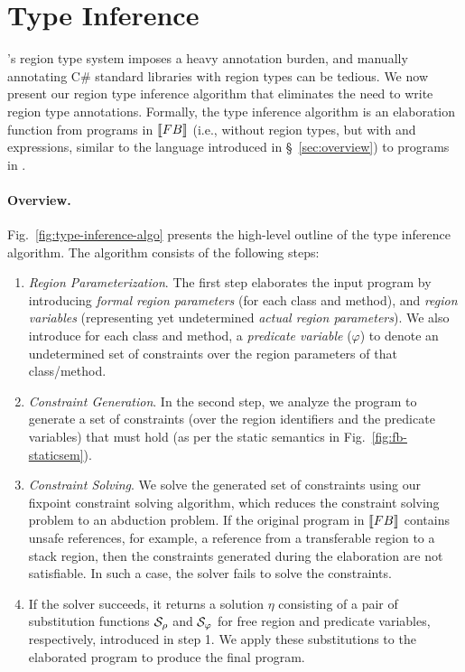 \newcommand{\soln}{\eta}
\newcommand{\saturate}[1]{{#1}^*}
\newcommand{\groundc}[1]{\saturate{#1}_g}

\section{Type Inference}
\label{sec:type-inference}

\name's region type system imposes a heavy annotation burden, and
manually annotating C\# standard libraries with region types
can be tedious. We now present our region type inference algorithm
that eliminates the need to write region type annotations.
Formally, the type inference
algorithm is an elaboration function from programs in $\llbracket {\sc FB} \rrbracket$
(i.e., \FB without region types, but with  and 
expressions, similar to the language introduced in
\S~\ref{sec:overview}) to programs in \FB.

\paragraph{Overview.}

Fig.~\ref{fig:type-inference-algo} presents the high-level outline of the type
inference algorithm.
The algorithm consists of the following steps:
\begin{enumerate}
 \item \emph{Region Parameterization}.
   The first step elaborates the input program by introducing \emph{formal region parameters}
   (for each class and method), and \emph{region variables} (representing yet undetermined
   \emph{actual region parameters}). We also introduce for each class and method, a
   \emph{predicate variable} ($\varphi$) to denote an undetermined set of constraints
   over the region parameters of that class/method.

 \item \emph{Constraint Generation}.
   In the second step, we analyze the program to generate a set of constraints
   (over the region identifiers and the predicate variables)
   that must hold (as per the static semantics in Fig.~\ref{fig:fb-staticsem}).

 \item \emph{Constraint Solving}.
   We solve the generated set of constraints using our fixpoint constraint
   solving algorithm, which reduces the constraint solving problem to
   an abduction problem. If the original program in $\llbracket {\sc FB} \rrbracket$ contains unsafe
   references, for example, a reference from a transferable region to a
   stack region, then the constraints generated during the elaboration
   are not satisfiable. In such a case, the solver fails to solve
   the constraints.

 \item If the solver succeeds, it returns a solution $\soln$ consisting of a
   pair of substitution functions $\mathcal{S}_\rho$ and $\mathcal{S}_\varphi$ for
   free region and predicate variables, respectively, introduced in step 1.
   We apply these substitutions to the elaborated program to produce the final program.
\end{enumerate}

